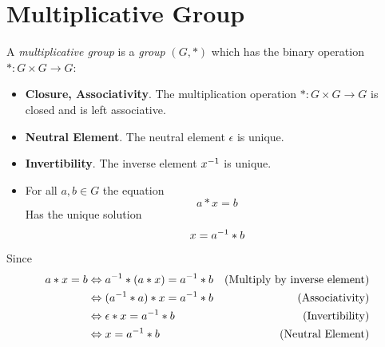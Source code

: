 \section{Multiplicative Group}

\begin{proposition}
    A \textit{multiplicative group} is a \textit{group} $(G, \ast)$ which has the binary operation $\ast \colon G \times G \to G$:
    \begin{itemize}
        \item \textbf{Closure, Associativity}. The multiplication operation $\ast \colon G \times G \to G$ is closed and is left associative.
        \item \textbf{Neutral Element}. The neutral element $\epsilon$ is unique.
        \item \textbf{Invertibility}. The inverse element ${x}^{-1}$ is unique.
        \item For all $a, b \in G$ the equation
        \begin{equation}
            a \ast x = b
        \end{equation}
        Has the unique solution
        \begin{equation}
            x = {a}^{-1} \ast b
        \end{equation}
    \end{itemize}
    Since
    \begin{align}
        a \ast x = b &\Leftrightarrow {a}^{-1} \ast (a \ast x) = {a}^{-1} \ast b &\text{(Multiply by inverse element)} \\
        &\Leftrightarrow ({a}^{-1} \ast a) \ast x = {a}^{-1} \ast b &\text{(Associativity)} \\
        &\Leftrightarrow \epsilon \ast x = {a}^{-1} \ast b &\text{(Invertibility)} \\
        &\Leftrightarrow x = {a}^{-1} \ast b &\text{(Neutral Element)}
    \end{align}
\end{proposition}

